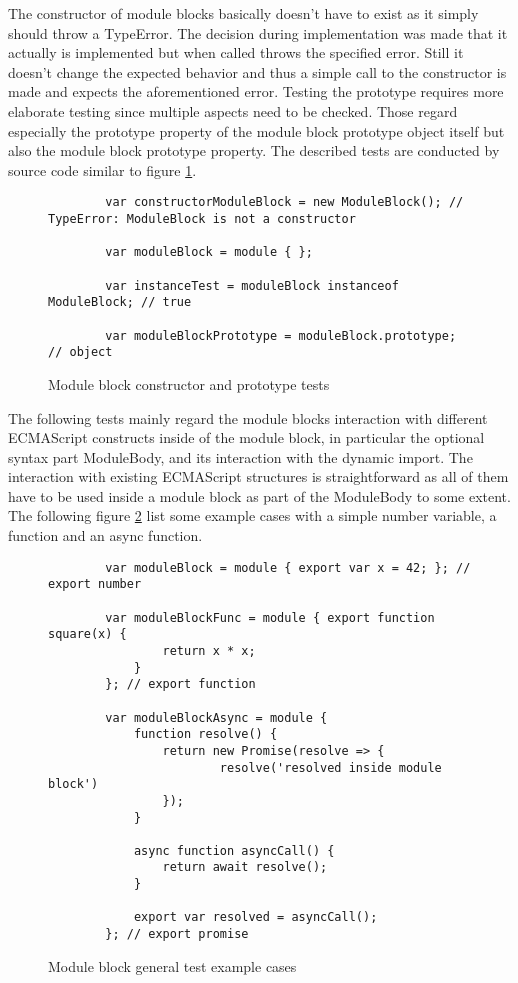 The constructor of module blocks basically doesn't have to exist as it simply should throw a TypeError. The decision during implementation was made that it actually is implemented but when called throws the specified error. Still it doesn't change the expected behavior and thus a simple call to the constructor is made and expects the aforementioned error. Testing the prototype requires more elaborate testing since multiple aspects need to be checked. Those regard especially the prototype property of the module block prototype object itself but also the module block prototype property. The described tests are conducted by source code similar to figure \ref{fig:testCoPro}.

\begin{figure}[h!]
    \begin{lstlisting}
        var constructorModuleBlock = new ModuleBlock(); // TypeError: ModuleBlock is not a constructor
        
        var moduleBlock = module { };
        
        var instanceTest = moduleBlock instanceof ModuleBlock; // true
        
        var moduleBlockPrototype = moduleBlock.prototype; // object
    \end{lstlisting}
    \caption{Module block constructor and prototype tests}
    \label{fig:testCoPro}
\end{figure}

The following tests mainly regard the module blocks interaction with different ECMAScript constructs inside of the module block, in particular the optional syntax part ModuleBody, and its interaction with the dynamic import. The interaction with existing ECMAScript structures is straightforward as all of them have to be used inside a module block as part of the ModuleBody to some extent. The following figure \ref{fig:testGeneral} list some example cases with a simple number variable, a function and an async function.

\begin{figure}[h!]
    \begin{lstlisting}
        var moduleBlock = module { export var x = 42; }; // export number
        
        var moduleBlockFunc = module { export function square(x) {
                return x * x;
            } 
        }; // export function
    
        var moduleBlockAsync = module {
            function resolve() {
                return new Promise(resolve => {
                        resolve('resolved inside module block')
                });
            }
        
            async function asyncCall() {
                return await resolve();
            }
        
            export var resolved = asyncCall(); 
        }; // export promise
    \end{lstlisting}
    \caption{Module block general test example cases}
    \label{fig:testGeneral}
\end{figure}

